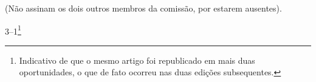 (Não assinam os dois outros membros da comissão, por estarem ausentes).


3--1\footnote{ Indicativo de que o mesmo artigo foi republicado em
  mais duas oportunidades, o que de fato ocorreu nas duas edições
  subsequentes.}

%

